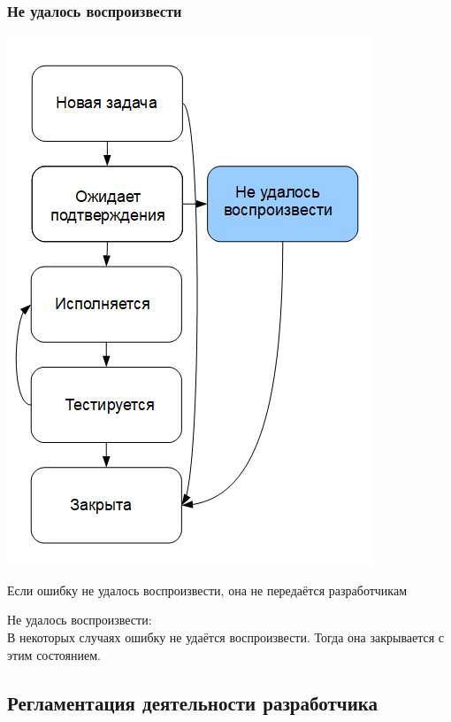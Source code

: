 \documentclass{../industrial-development}
\begin{document}
\begin{frame} \frametitle{Не удалось воспроизвести}
\begin{minipage}{0.49\textwidth}
  \begin{flushleft}
		\includegraphics[height=0.8\textheight]{cyc8.png}
  \end{flushleft}
\end{minipage}
\begin{minipage}{0.5\textwidth}
  \begin{flushright}
		\begin{block}{}
		Если ошибку не удалось воспроизвести, она не передаётся разработчикам
		\end{block}
  \end{flushright}
\end{minipage}
\end{frame}
\lecturenotes
Не удалось воспроизвести:\\
В некоторых случаях ошибку не удаётся воспроизвести. Тогда она закрывается с этим состоянием.

\subsection{Регламентация деятельности разработчика}
\end{document}
